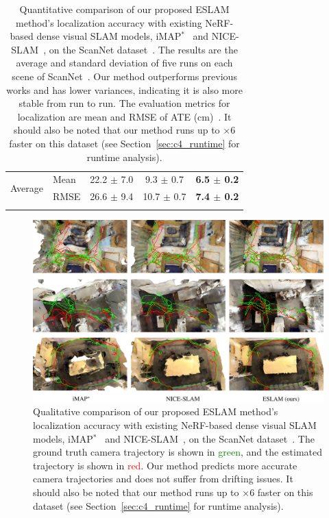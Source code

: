 \begin{table}[t]
\begin{center}
\begin{tabular}{ll|ccc}
            \hline
            \multirow{2}{*}{Average} & Mean & 22.2 $\pm$ \phantom{0}7.0 & \phantom{0}9.3 $\pm$ 0.7 & \textbf{6.5 $\pm$ 0.2} \\
            & RMSE & 26.6 $\pm$ \phantom{0}9.4 & 10.7 $\pm$ 0.7 & \textbf{7.4 $\pm$ 0.2} \\

            \Xhline{2\arrayrulewidth}
        \end{tabular}
    \end{center}
    \caption{Quantitative comparison of our proposed ESLAM method's localization accuracy with existing NeRF-based dense visual SLAM models, iMAP$^{*}$~\citep{sucar2021imap} and NICE-SLAM~\citep{zhu2022nice}, on the ScanNet dataset~\citep{dai2017scannet}. The results are the average and standard deviation of five runs on each scene of ScanNet~\citep{dai2017scannet}. Our method outperforms previous works and has lower variances, indicating it is also more stable from run to run. The evaluation metrics for localization are mean and RMSE of ATE (cm)~\citep{sturm2012benchmark}. It should also be noted that our method runs up to $\times$6 faster on this dataset (see Section~\ref{sec:c4_runtime} for runtime analysis).}
    \label{table:quantitative_scannet}
\end{table}

\begin{figure}[t]
    \begin{center}
        \includegraphics[width=1.0\linewidth]{images/chapter4/figures/Fig4.jpg}
    \end{center}
    \caption{Qualitative comparison of our proposed ESLAM method's localization accuracy with existing NeRF-based dense visual SLAM models, iMAP$^*$~\citep{sucar2021imap} and NICE-SLAM~\citep{zhu2022nice}, on the ScanNet dataset~\citep{dai2017scannet}. The ground truth camera trajectory is shown in \textcolor{green}{green}, and the estimated trajectory is shown in \textcolor{red}{red}. Our method predicts more accurate camera trajectories and does not suffer from drifting issues. It should also be noted that our method runs up to $\times$6 faster on this dataset (see Section~\ref{sec:c4_runtime} for runtime analysis).}
    \label{fig:c4_qualitative_tracking}
\end{figure}

